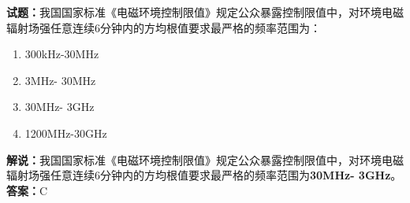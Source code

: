 \documentclass{ctexbook}
\begin{document}
%
%


%
%
%


%


\noindent\textbf{试题：}我国国家标准《电磁环境控制限值》规定公众暴露控制限值中，对环境电磁辐射场强任意连续6分钟内的方均根值要求最严格的频率范围为： 
\begin{enumerate}[leftmargin=3em]
\item 300kHz-30MHz
\item 3MHz- 30MHz
\item 30MHz- 3GHz
\item 1200MHz-30GHz
\end{enumerate}
\noindent\textbf{解说：}我国国家标准《电磁环境控制限值》规定公众暴露控制限值中，对环境电磁辐射场强任意连续6分钟内的方均根值要求最严格的频率范围为\textbf{30MHz- 3GHz}。\\\textbf{答案：}C
\end{document}
